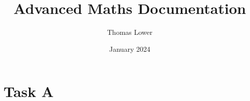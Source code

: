 \documentclass{article}
\title{Advanced Maths Documentation}
\author{Thomas Lower}
\date{January 2024}
\begin{document}
\maketitle

\pagebreak

\section{Task A}



\pagebreak

\printbibliography

\pagebreak
\end{document}
